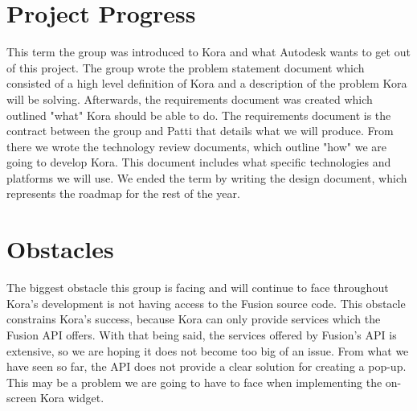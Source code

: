 \documentclass[onecolumn, draftclsnofoot,10pt, compsoc]{IEEEtran}
\begin{document}
\section{Project Progress}
	This term the group was introduced to Kora and what Autodesk wants to get out of this project.
	The group wrote the problem statement document which consisted of a high level definition of Kora and a description of the problem Kora will be solving.
	Afterwards, the requirements document was created which outlined "what" Kora should be able to do.
	The requirements document is the contract between the group and Patti that details what we will produce.
	From there we wrote the technology review documents, which outline "how" we are going to develop Kora.
	This document includes what specific technologies and platforms we will use.
	We ended the term by writing the design document, which represents the roadmap for the rest of the year.
	

\section{Obstacles}
	The biggest obstacle this group is facing and will continue to face throughout Kora's development is not having access to the Fusion source code.
	This obstacle constrains Kora's success, because Kora can only provide services which the Fusion API offers.
	With that being said, the services offered by Fusion's API is extensive, so we are hoping it does not become too big of an issue.
	From what we have seen so far, the API does not provide a clear solution for creating a pop-up.
	This may be a problem we are going to have to face when implementing the on-screen Kora widget.
	
	
\end{document}
